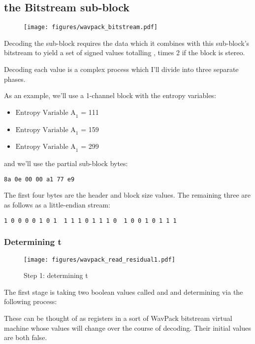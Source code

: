 \clearpage
\subsection{the Bitstream sub-block}
\begin{figure}[h]
\texttt{[image: figures/wavpack\_bitstream.pdf]}
\end{figure}
\par
\noindent

Decoding the  sub-block requires the 
data which it combines with this sub-block's bitstream to yield a set of signed
values totalling , times 2 if the block is stereo.

Decoding each value is a complex process which I'll divide into
three separate phases.

As an example, we'll use a 1-channel block with the entropy variables:
\begin{itemize}
\item $\text{Entropy Variable A}_1$ = 111
\item $\text{Entropy Variable A}_1$ = 159
\item $\text{Entropy Variable A}_1$ = 299
\end{itemize}
and we'll use the partial sub-block bytes:
\begin{Verbatim}[frame=single]
8a 0e 00 00 a1 77 e9
\end{Verbatim}
The first four bytes are the header and block size values.
The remaining three are as follows as a little-endian stream:
\begin{Verbatim}[frame=single]
1 0 0 0 0 1 0 1  1 1 1 0 1 1 1 0  1 0 0 1 0 1 1 1
\end{Verbatim}

\clearpage
\subsubsection{Determining t}
\begin{wrapfigure}[37]{r}{3in}
\texttt{[image: figures/wavpack\_read\_residual1.pdf]}
\caption{Step 1: determining t}
\end{wrapfigure}
The first stage is taking two boolean values called
 and  and determining 
via the following process:

These can be thought of as registers in a sort of
WavPack bitstream virtual machine whose values will
change over the course of decoding.
Their initial values are both false.

